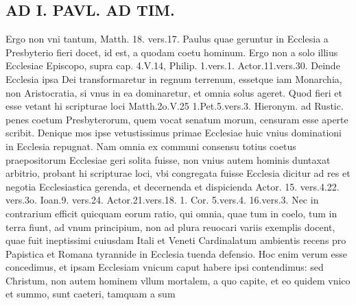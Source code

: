 \documentclass{article}
\begin{document}
\begin{pages}
\section*{AD I. PAVL. AD TIM. }
\marginpar{[ p.242 ]}\pstart Ergo non vni tantum, Matth. 18. vers.17. Paulus quae geruntur in Ecclesia a Presbyterio fieri docet, id est, a quodam coetu hominum. Ergo non a solo illius Ecclesiae Episcopo, supra cap. 4.V.14, Philip. 1.vers.1. Actor.11.vers.30. Deinde Ecclesia ipsa Dei transformaretur in regnum terrenum, essetque iam Monarchia, non Aristocratia, si vnus in ea dominaretur, et omnia solus ageret. Quod fieri et esse vetant hi scripturae loci Matth.2o.V.25 1.Pet.5.vers.3. Hieronym. ad Rustic. penes coetum Presbyterorum, quem vocat senatum morum, censuram esse aperte scribit. Denique mos ipse vetustissimus primae Ecclesiae huic vnius dominationi in Ecclesia repugnat. Nam omnia ex communi consensu totius coetus praepositorum Ecclesiae geri solita fuisse, non vnius autem hominis duntaxat arbitrio, probant hi scripturae loci, vbi congregata fuisse Ecclesia dicitur ad res et negotia Ecclesiastica gerenda, et decernenda et dispicienda Actor. 15. vers.4.22. vers.3o. Ioan.9. vers.24. Actor.21.vers.18. 1. Cor. 5.vers.4. 16.vers.3. Nec in contrarium efficit quicquam eorum ratio, qui omnia, quae tum in coelo, tum in terra fiunt, ad vnum principium, non ad plura reuocari variis exemplis docent, quae fuit ineptissimi cuiusdam Itali et Veneti Cardinalatum ambientis recens pro Papistica et Romana tyrannide in Ecclesia tuenda defensio. Hoc enim verum esse concedimus, et ipsam Ecclesiam vnicum caput habere ipsi contendimus: sed Christum, non autem hominem vllum mortalem, a quo capite, et eo quidem vnico et summo, sunt caeteri, tamquam a sum\pend

\end{pages}
\end{document}
